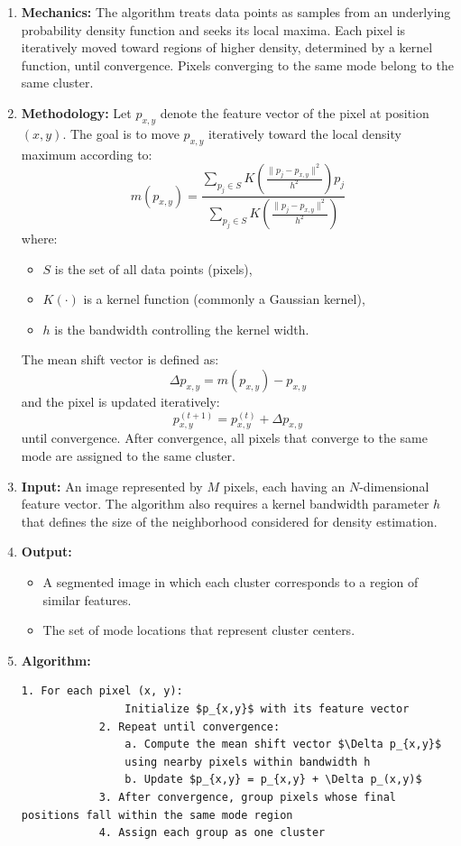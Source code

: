 \documentclass[conference]{IEEEtran}
\begin{document}
	\begin{enumerate}
		\item \textbf{Mechanics:}  
		The algorithm treats data points as samples from an underlying probability density function and seeks its local maxima. Each pixel is iteratively moved toward regions of higher density, determined by a kernel function, until convergence. Pixels converging to the same mode belong to the same cluster.
		
		\item \textbf{Methodology:}  
		Let $p_{x,y}$ denote the feature vector of the pixel at position $(x, y)$. The goal is to move $p_{x,y}$ iteratively toward the local density maximum according to:
		\[
		m(p_{x,y}) = \frac{\sum\limits_{p_j \in S} K\!\left(\frac{\|p_j - p_{x,y}\|^2}{h^2}\right)p_j}{\sum\limits_{p_j \in S} K\!\left(\frac{\|p_j - p_{x,y}\|^2}{h^2}\right)}
		\]
		where:
		\begin{itemize}
			\item $S$ is the set of all data points (pixels),
			\item $K(\cdot)$ is a kernel function (commonly a Gaussian kernel),
			\item $h$ is the bandwidth controlling the kernel width.
		\end{itemize}
		
		The mean shift vector is defined as:
		\[
		\Delta p_{x,y} = m(p_{x,y}) - p_{x,y}
		\]
		and the pixel is updated iteratively:
		\[
		p_{x,y}^{(t+1)} = p_{x,y}^{(t)} + \Delta p_{x,y}
		\]
		until convergence.
		After convergence, all pixels that converge to the same mode are assigned to the same cluster.
		
		\item \textbf{Input:}  
			An image represented by $M$ pixels, each having an $N$-dimensional feature vector.  
			The algorithm also requires a kernel bandwidth parameter $h$ that defines the size of the neighborhood considered for density estimation.
		
		\item \textbf{Output:}  
		\begin{itemize}
			\item A segmented image in which each cluster corresponds to a region of similar features.  
			\item The set of mode locations that represent cluster centers.  
		\end{itemize}
		
		\item \textbf{Algorithm:}
		\begin{lstlisting}[mathescape=true]
			1. For each pixel (x, y):
				Initialize $p_{x,y}$ with its feature vector
			2. Repeat until convergence:
				a. Compute the mean shift vector $\Delta p_{x,y}$
				using nearby pixels within bandwidth h
				b. Update $p_{x,y} = p_{x,y} + \Delta p_(x,y)$
			3. After convergence, group pixels whose final positions fall within the same mode region
			4. Assign each group as one cluster
		\end{lstlisting}
	\end{enumerate}
\end{document}
